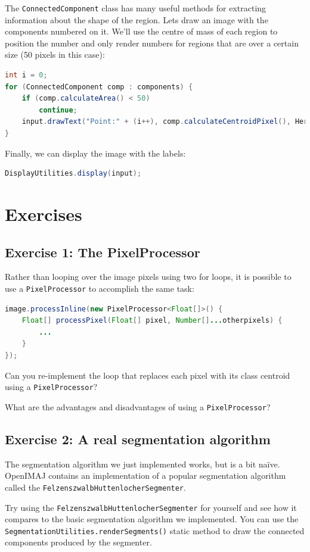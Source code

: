 \documentclass[10pt,a4paper,twoside,extrafontsizes]{memoir}
\begin{document}
The \verb+ConnectedComponent+ class has many useful methods for extracting information 
about the shape of the region. Lets draw an image with the components numbered on it. We'll use the 
centre of mass of each region to position the number and only render numbers for regions that 
are over a certain size (50 pixels in this case):
\begin{lstlisting}[language=java]
int i = 0;
for (ConnectedComponent comp : components) {
    if (comp.calculateArea() < 50) 
        continue;
    input.drawText("Point:" + (i++), comp.calculateCentroidPixel(), HersheyFont.TIMES_MEDIUM,20);
}
\end{lstlisting}
Finally, we can display the image with the labels:
\begin{lstlisting}[language=java]
DisplayUtilities.display(input);
\end{lstlisting}

\pagebreak
\section*{Exercises}
\subsection*{Exercise 1: The PixelProcessor}
Rather than looping over the image pixels using two for loops, it is possible to use a 
\verb+PixelProcessor+ to accomplish the same task:
\begin{lstlisting}[language=java]
image.processInline(new PixelProcessor<Float[]>() {
    Float[] processPixel(Float[] pixel, Number[]...otherpixels) {
        ...
    }
});
\end{lstlisting}
Can you re-implement the loop that replaces each pixel with its class centroid 
using a \verb+PixelProcessor+? 

What are the advantages and disadvantages of using a \verb+PixelProcessor+?

\subsection*{Exercise 2: A real segmentation algorithm}
The segmentation algorithm we just implemented works, but is a bit na\"ive. OpenIMAJ contains an 
implementation of a popular segmentation algorithm called the \verb+FelzenszwalbHuttenlocherSegmenter+. 

Try using the \verb+FelzenszwalbHuttenlocherSegmenter+ for yourself and see how it compares to the 
basic segmentation algorithm we implemented. You can use the \verb+SegmentationUtilities.renderSegments()+ 
static method to draw the connected components produced by the segmenter.
\end{document}
